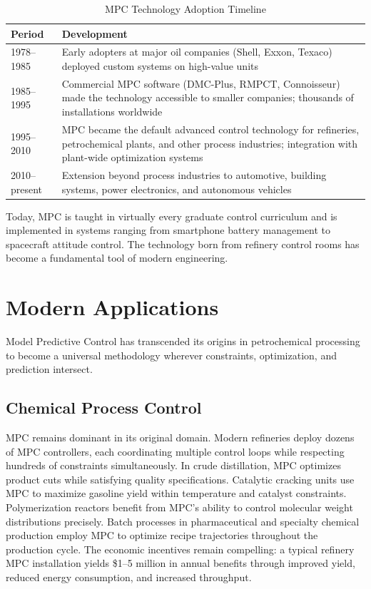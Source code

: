 \begin{table}[htbp]
\centering
\caption{MPC Technology Adoption Timeline}
\label{tab:mpc_adoption}
\begin{tabular}{lp{10cm}}
\toprule
\textbf{Period} & \textbf{Development} \\
\midrule
1978--1985 & Early adopters at major oil companies (Shell, Exxon, Texaco) deployed custom systems on high-value units \\
1985--1995 & Commercial MPC software (DMC-Plus, RMPCT, Connoisseur) made the technology accessible to smaller companies; thousands of installations worldwide \\
1995--2010 & MPC became the default advanced control technology for refineries, petrochemical plants, and other process industries; integration with plant-wide optimization systems \\
2010--present & Extension beyond process industries to automotive, building systems, power electronics, and autonomous vehicles \\
\bottomrule
\end{tabular}
\end{table}

Today, MPC is taught in virtually every graduate control curriculum and is implemented in systems ranging from smartphone battery management to spacecraft attitude control. The technology born from refinery control rooms has become a fundamental tool of modern engineering.

\section{Modern Applications}
\label{sec:applications}

Model Predictive Control has transcended its origins in petrochemical processing to become a universal methodology wherever constraints, optimization, and prediction intersect.

\subsection{Chemical Process Control}

MPC remains dominant in its original domain. Modern refineries deploy dozens of MPC controllers, each coordinating multiple control loops while respecting hundreds of constraints simultaneously. In crude distillation, MPC optimizes product cuts while satisfying quality specifications. Catalytic cracking units use MPC to maximize gasoline yield within temperature and catalyst constraints. Polymerization reactors benefit from MPC's ability to control molecular weight distributions precisely. Batch processes in pharmaceutical and specialty chemical production employ MPC to optimize recipe trajectories throughout the production cycle. The economic incentives remain compelling: a typical refinery MPC installation yields \$1--5 million in annual benefits through improved yield, reduced energy consumption, and increased throughput.

